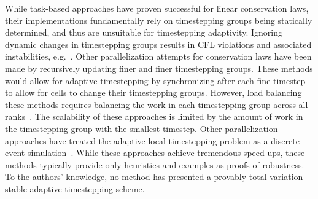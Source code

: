 While task-based approaches have proven successful for linear conservation laws, their implementations fundamentally rely on timestepping groups being statically determined, and thus are unsuitable for timestepping adaptivity.
Ignoring dynamic changes in timestepping groups results in CFL violations and associated instabilities, e.g.~\cite{Trahan2012,Gnedin2018}. 
Other parallelization attempts for conservation laws have been made by recursively updating finer and finer timestepping groups. These methods would allow for adaptive timestepping by synchronizing after each fine timestep to allow for cells to change their timestepping groups. However, load balancing these methods requires balancing the work in each timestepping group across all ranks~\cite{Rietmann2015,Seny2014}. The scalability of these approaches is limited by the amount of work in the timestepping group with the smallest timestep.
Other parallelization approaches have treated the adaptive local timestepping problem as a discrete event simulation~\cite{Karimabadi2006, Omelchenko2006, Unfer2007, Omelchenko2012, Omelchenko2014,Stone2017,Shao2019}. While these approaches achieve tremendous speed-ups, these methods typically provide only heuristics and examples as proofs of robustness. To the authors' knowledge, no method has presented a provably total-variation stable adaptive timestepping scheme.